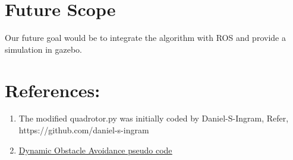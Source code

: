 \documentclass{IEEEtran}
\begin{document}
\section{\textbf{Future Scope}}
Our future goal would be to integrate the algorithm with ROS and provide a simulation in gazebo. 
\section{References:}
\begin{enumerate}
\item The modified quadrotor.py was initially coded by Daniel-S-Ingram, Refer,
https://github.com/daniel-s-ingram
\item \href{https://arxiv.org/pdf/1704.04585.pdf}{\underline{Dynamic Obstacle Avoidance pseudo code}}
\end{enumerate}
\end{document}
